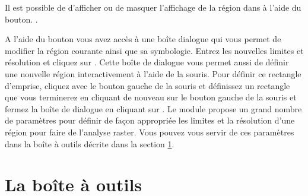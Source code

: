 {%
Il est possible de d'afficher ou de masquer l'affichage de la région \grass dans \qg à l'aide du bouton. .


A l'aide du bouton  vous avez accès à une boîte dialogue qui vous permet de modifier la région courante ainsi que sa symbologie. Entrez les nouvelles limites et résolution et cliquez sur . Cette boîte de dialogue vous permet aussi de définir une nouvelle région interactivement à l'aide de la souris. Pour définir ce rectangle d'emprise, cliquez avec le bouton gauche de la souris et définissez un rectangle que vous terminerez en cliquant de nouveau sur le bouton gauche de la souris et fermez la boîte de dialogue en cliquant sur . Le module \grass {} propose un grand nombre de paramètres pour définir de façon appropriée les limites et la résolution d'une région pour faire de l'analyse raster. Vous pouvez vous servir de ces paramètres dans la boîte à outils \grass décrite dans la section \ref{subsec:grass_toolbox}.

\section{La boîte à outils \grass}\label{subsec:grass_toolbox}

}
